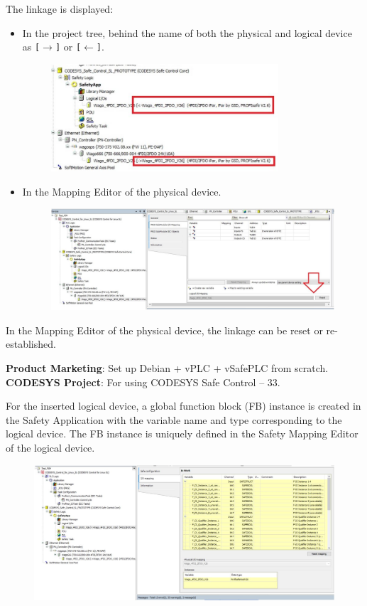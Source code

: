 \documentclass[a4paper,12pt]{article}
\begin{document}
The linkage is displayed:
\begin{itemize}
	\item In the project tree, behind the name of both the physical and logical device as \texttt{[$\rightarrow$]} or \texttt{[$\leftarrow$]}.
	\begin{figure}[H]
		\centering
		\includegraphics[width=0.8\textwidth]{21.JPG}
	\end{figure}
	\item In the Mapping Editor of the physical device.
	\begin{figure}[H]
		\centering
		\includegraphics[width=1\textwidth]{22.JPG}
	\end{figure}
\end{itemize}

In the Mapping Editor of the physical device, the linkage can be reset or re-established.

\textbf{Product Marketing}: Set up Debian + vPLC + vSafePLC from scratch. \\
\textbf{CODESYS Project}: For using CODESYS Safe Control – 33.

For the inserted logical device, a global function block (FB) instance is created in the Safety Application with the variable name and type corresponding to the logical device. The FB instance is uniquely defined in the Safety Mapping Editor of the logical device.
\begin{figure}[H]
	\centering
	\includegraphics[width=1\textwidth]{23.JPG}
\end{figure}
\end{document}
